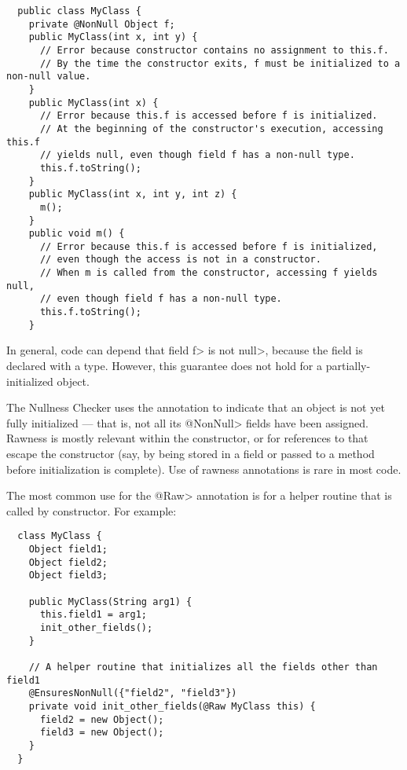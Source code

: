 \begin{Verbatim}
  public class MyClass {
    private @NonNull Object f;
    public MyClass(int x, int y) {
      // Error because constructor contains no assignment to this.f.
      // By the time the constructor exits, f must be initialized to a non-null value.
    }
    public MyClass(int x) {
      // Error because this.f is accessed before f is initialized.
      // At the beginning of the constructor's execution, accessing this.f
      // yields null, even though field f has a non-null type.
      this.f.toString();
    }
    public MyClass(int x, int y, int z) {
      m();
    }
    public void m() {
      // Error because this.f is accessed before f is initialized,
      // even though the access is not in a constructor.
      // When m is called from the constructor, accessing f yields null,
      // even though field f has a non-null type.
      this.f.toString();
    }
\end{Verbatim}

\noindent
In general, code can depend that field \<f> is not \<null>, because the
field is declared with a  type.
However, this guarantee does not hold for a partially-initialized object.

The Nullness Checker uses the  annotation to indicate that an object
is not yet fully initialized --- that is, not all its \<@NonNull> fields have been
assigned.  Rawness is mostly relevant within the constructor, or for
references to  that escape the constructor (say, by being stored
in a field or passed to a method before initialization is complete).
Use of rawness annotations is rare in most code.

The most common use for the \<@Raw> annotation is for a helper routine that
is called by constructor.  For example:

\begin{Verbatim}
  class MyClass {
    Object field1;
    Object field2;
    Object field3;

    public MyClass(String arg1) {
      this.field1 = arg1;
      init_other_fields();
    }

    // A helper routine that initializes all the fields other than field1
    @EnsuresNonNull({"field2", "field3"})
    private void init_other_fields(@Raw MyClass this) {
      field2 = new Object();
      field3 = new Object();
    }
  }
\end{Verbatim}

